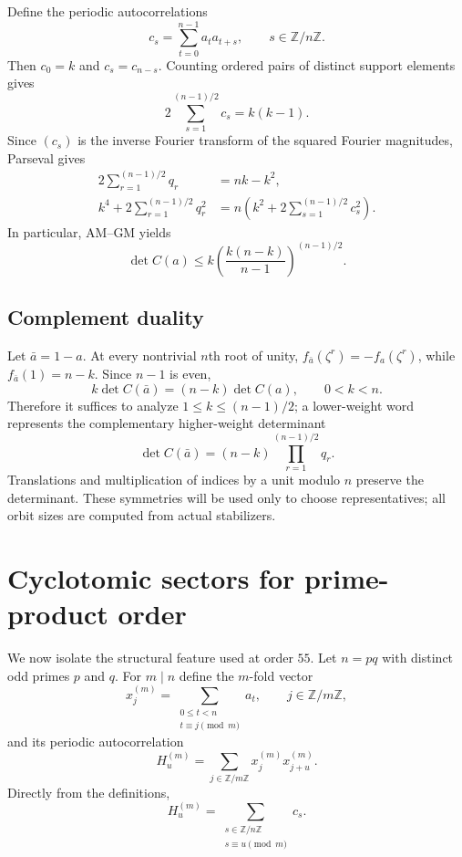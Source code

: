\documentclass[11pt,a4paper]{article}
\theoremstyle{definition}
\theoremstyle{remark}
\newcommand{\Z}{\mathbb Z}
\begin{document}
Define the periodic autocorrelations
\[
  c_s=\sum_{t=0}^{n-1}a_ta_{t+s},\qquad s\in\Z/n\Z.
\]
Then $c_0=k$ and $c_s=c_{n-s}$.  Counting ordered pairs of distinct support
elements gives
\begin{equation}
\label{eq:corrsum-general}
  2\sum_{s=1}^{(n-1)/2}c_s=k(k-1).
\end{equation}
Since $(c_s)$ is the inverse Fourier transform of the squared Fourier
magnitudes, Parseval gives
\begin{align}
  2\sum_{r=1}^{(n-1)/2}q_r&=nk-k^2,
  \label{eq:firstmoment-general}\\
  k^4+2\sum_{r=1}^{(n-1)/2}q_r^2
    &=n\left(k^2+2\sum_{s=1}^{(n-1)/2}c_s^2\right).
  \label{eq:secondmoment-general}
\end{align}
In particular, AM--GM yields
\begin{equation}
\label{eq:amgm-general}
  \det C(a)\le
  k\left(\frac{k(n-k)}{n-1}\right)^{(n-1)/2}.
\end{equation}

\subsection{Complement duality}

Let $\bar a=1-a$.  At every nontrivial $n$th root of unity,
$f_{\bar a}(\zeta^r)=-f_a(\zeta^r)$, while
$f_{\bar a}(1)=n-k$.  Since $n-1$ is even,
\begin{equation}
\label{eq:complement-general}
  k\det C(\bar a)=(n-k)\det C(a),\qquad 0<k<n.
\end{equation}
Therefore it suffices to analyze $1\le k\le(n-1)/2$; a lower-weight word
represents the complementary higher-weight determinant
\begin{equation}
\label{eq:compdet-general}
  \det C(\bar a)=(n-k)\prod_{r=1}^{(n-1)/2}q_r.
\end{equation}
Translations and multiplication of indices by a unit modulo $n$ preserve the
determinant.  These symmetries will be used only to choose representatives;
all orbit sizes are computed from actual stabilizers.

\section{Cyclotomic sectors for prime-product order}
\label{sec:pq}

We now isolate the structural feature used at order $55$.  Let
$n=pq$ with distinct odd primes $p$ and $q$.  For $m\mid n$ define the
$m$-fold vector
\[
  x^{(m)}_j=\sum_{\substack{0\le t<n\\t\equiv j\pmod m}}a_t,
  \qquad j\in\Z/m\Z,
\]
and its periodic autocorrelation
\[
  H^{(m)}_u=\sum_{j\in\Z/m\Z}x^{(m)}_j x^{(m)}_{j+u}.
\]
Directly from the definitions,
\begin{equation}
\label{eq:foldcorr-general}
  H^{(m)}_u=\sum_{\substack{s\in\Z/n\Z\\s\equiv u\pmod m}}c_s.
\end{equation}
\end{document}

